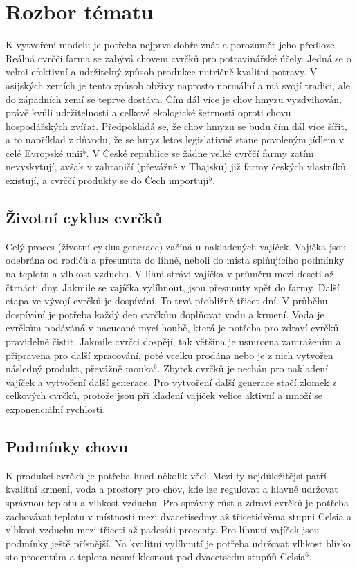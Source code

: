\documentclass[a4paper, 12pt]{extarticle}
\begin{document}
\section{Rozbor tématu}
K vytvoření modelu je potřeba nejprve dobře znát a porozumět jeho předloze. Reálná cvrččí farma se zabývá chovem cvrčků pro potravinářské účely. Jedná se o velmi efektivní a udržitelný způsob produkce nutričně kvalitní potravy. V asijských zemích je tento způsob obživy naprosto normální a má svojí tradici, ale do západních zemí se teprve dostáva. Čím dál více je chov hmyzu vyzdvihován, právě kvůli udržitelnosti a celkové ekologické šetrnosti oproti chovu hospodářských zvířat. Předpokládá se, že chov hmyzu se budu čím dál více šířit, a to například z důvodu, že se hmyz letos legislativně stane povoleným jídlem v celé Evropské unii$^{5}$. V České republice se žádne velké cvrččí farmy  zatím nevyskytují, avšak v zahraničí (převážně v Thajsku) již farmy českých vlastníků existují, a cvrččí produkty se do Čech importují$^{5}$. 

\subsection{Životní cyklus cvrčků} \label{cyklus} 
Celý proces (životní cyklus generace) začíná u nakladených vajíček. Vajíčka jsou odebrána od rodičů a přesunuta do líhně, neboli do místa splňujícího podmínky na teplotu a vlhkost vzduchu. V líhni stráví vajíčka v průměru mezi deseti až čtrnácti dny. Jakmile se vajíčka vylíhnout, jsou přesunuty zpět do farmy. Další etapa ve vývojí cvrčků je dospívání. To trvá přobližně třicet dní. V průběhu dospívání je potřeba každý den cvrčkům doplňovat vodu a krmení. Voda je cvrčkům podáváná v nacucané mycí houbě, která je potřeba pro zdraví cvrčků pravidelně čistit. Jakmile cvrčci dospějí, tak většina je usmrcena zamražením a  připravena pro další zpracování, poté vcelku prodána nebo je z nich vytvořen následný produkt, převážně mouka$^{6}$. Zbytek cvrčků je nechán pro nakladení vajíček a vytvoření další generace. Pro vytvoření další generace stačí zlomek z celkových cvrčků, protože jsou při kladení vajíček velice aktivní a množí se exponenciální rychlostí. 

\newpage

\subsection{Podmínky chovu}
K produkci cvrčků je potřeba hned několik věcí. Mezi ty nejdůležitějsí patří kvalitní krmení, voda a prostory pro chov, kde lze regulovat a hlavně udržovat správnou teplotu a vlhkost vzduchu. Pro správný růst a zdraví cvrčků je potřeba zachovávat teplotu v místnosti mezi dvacetisedmy až třicetidvěma stupni Celsia a vlhkost vzduchu mezi třiceti až padesáti procenty. Pro líhnutí vajíček jsou podmínky ještě přísnější. Na kvalitní vylíhnutí je potřeba udržovat vlhkost blízko sto procentům a teplota nesmí klesnout pod dvacetsedm stupňů Celsia$^{6}$.
\end{document}
